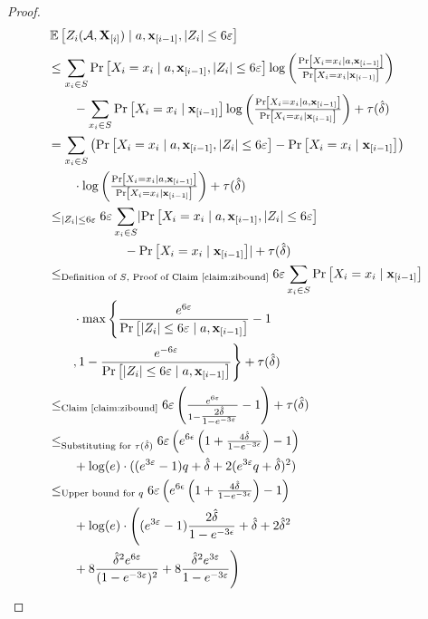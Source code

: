 \begin{proof}
\begin{align*}
& \Ex{}{Z_i(\cA,\bX_{[i]})\mid a,\bbx_{[i-1]}, \abs{Z_i}\leq 6\eps} \\
& \leq \sum_{x_i \in  S} \prob{X_i = x_i\mid a,\bbx_{[i-1]},\abs{Z_i}\leq 6\eps} \log\left( \tfrac{\prob{X_i = x_i \mid a,\bbx_{[i-1]}}}{\prob{X_i = x_i  \mid \bbx_{[i-1]}}} \right)  \\
& \qquad - \sum_{x_i \in  S} \prob{X_i = x_i  \mid \bbx_{[i-1]}} \log\left(\tfrac{\prob{X_i = x_i \mid a,\bbx_{[i-1]}}}{\prob{X_i = x_i  \mid \bbx_{[i-1]}}} \right) + \tau(\hat\delta) \\
& = \sum_{x_i \in  S} \left(\prob{X_i = x_i\mid a,\bbx_{[i-1]},\abs{Z_i}\leq 6\eps} - \prob{X_i = x_i  \mid \bbx_{[i-1]}}\right) \\
& \qquad \cdot \log\left( \tfrac{\prob{X_i = x_i \mid  a,\bbx_{[i-1]}}}{\prob{X_i = x_i  \mid \bbx_{[i-1]}}} \right)+ \tau(\hat\delta) \\
&\leq_{|Z_i| \leq 6\eps } 6\eps \sum_{x_i \in  S} \abs{\prob{X_i = x_i\mid a,\bbx_{[i-1]},\abs{Z_i}\leq 6\eps} \\
& \qquad \qquad \qquad - \prob{X_i = x_i  \mid \bbx_{[i-1]}}}+ \tau(\hat\delta) \\
& \leq_{\text{Definition of $S$, Proof of Claim~\ref{claim:zibound}}} 6\eps \sum_{x_i \in  S} \prob{X_i = x_i  \mid \bbx_{[i-1]}} \\
& \qquad \cdot \max\Bigg\{ \dfrac{e^{6\eps} }{\prob{|Z_i| \leq 6\eps \mid a,\bbx_{[i-1]}}} - 1 \\
& \qquad, 1 - \dfrac{e^{-6\eps} }{\prob{|Z_i| \leq 6\eps \mid a,\bbx_{[i-1]}}}  \Bigg\} + \tau(\hat\delta) \\ 
& \leq_{\text{Claim~\ref{claim:zibound}}} 6\eps \left(\tfrac{e^{6\eps}}{1- \tfrac{2\hat\delta}{1-e^{-3\eps}}} - 1\right) + \tau(\hat\delta)\\
&\leq_{\text{Substituting for $\tau(\hat\delta)$}} 6\eps\left(e^{6\epsilon} \left( 1+ \tfrac{4\hat\delta}{1-e^{-3\epsilon} } \right) - 1 \right) \\
& \qquad + \log(e) \cdot ( (e^{3\eps}-1)q + \hat{\delta} + 2(e^{3\eps}q + \hat{\delta})^2 ) \\
& \leq_{\text{Upper bound for $q$}} 
6\eps\left(e^{6\epsilon} \left( 1+ \tfrac{4\hat\delta}{1-e^{-3\epsilon} } \right) - 1 \right) \\
& \qquad + \log(e) \cdot \Bigg( (e^{3\eps}-1)\frac{2 \hat{\delta}}{1-e^{-3\epsilon}} + \hat{\delta} + 2 \hat{\delta}^2 \\
& \qquad + 8\frac{\hat{\delta}^2 e^{6 \eps}}{(1-e^{-3\eps})^2} + 8\frac{\hat{\delta}^2 e^{3 \eps}}{1-e^{-3\eps}} \Bigg) \\

\end{align*}
\end{proof}
